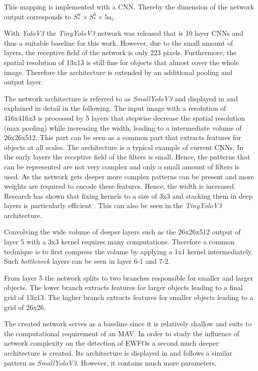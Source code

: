 This mapping is implemented with a \ac{CNN}. Thereby the dimension of the network output corresponds to $S^w_*\times S^h_*\times 5a_i$.

With \textit{YoloV3} the \textit{TinyYoloV3} network was released that is 10 layer \acp{CNN} and thus a suitable baseline for this work. However, due to the small amount of layers, the receptive field of the network is only 223 pixels. Furthermore, the spatial resolution of 13x13 is still fine for objects that almost cover the whole image. Therefore the architecture is extended by an additional pooling and output layer. 

The network architecture is referred to as \textit{SmallYoloV3} and displayed in  and explained in detail in the following. The input image with a resolution of 416x416x3 is processed by 5 layers that stepwise decrease the spatial resolution (max pooling) while increasing the width, leading to a intermediate volume of 26x26x512. This part can be seen as a common part that extracts features for objects at all scales. The architecture is a typical example of current \acp{CNN}. In the early layers the receptive field of the filters is small. Hence, the patterns that can be represented are not very complex and only a small amount of filters is used. As the network gets deeper more complex patterns can be present and more weights are required to encode these features. Hence, the width is increased. Research has shown that fixing kernels to a size of 3x3 and stacking them in deep layers is particularly efficient . This can also be seen in the \textit{TinyYoloV3} architecture. 

Convolving the wide volume of deeper layers such as the 26x26x512  output of layer 5 with a 3x3 kernel requires many computations. Therefore a common technique is to first compress the volume by applying a 1x1 kernel intermediately. Such \textit{bottleneck} layers can be seen in layer 6-1 and 7-2.

From layer 5 the network splits to two branches responsible for smaller and larger objects. The lower branch extracts features for larger objects leading to a final grid of 13x13. The higher branch extracts features for smaller objects leading to a grid of 26x26.

The created network serves as a baseline since it is relatively shallow and suits to the computational requirement of an \ac{MAV}. In order to study the influence of network complexity on the detection of \acp{EWFO} a second much deeper architecture is created. Its architecture is displayed in  and follows a similar pattern as \textit{SmallYoloV3}. However, it contains much more parameters.

